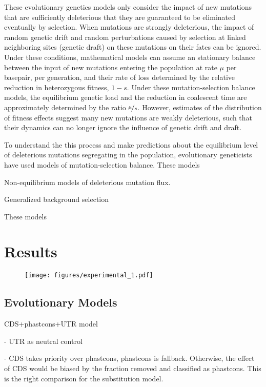 \documentclass[11pt]{article}
\begin{document}
These evolutionary genetics models only consider the impact of new mutations
that are sufficiently deleterious that they are guaranteed to be eliminated
eventually by selection. When mutations are strongly deleterious, the impact of
random genetic drift and random perturbations caused by selection at linked
neighboring sites (genetic draft) on these mutations on their fates can be
ignored. Under these conditions, mathematical models can assume an stationary
balance between the input of new mutations entering the population at rate
$\mu$ per basepair, per generation, and their rate of loss determined by the
relative reduction in heterozygous fitness, $1-s$. Under these
mutation-selection balance models, the equilibrium genetic load and the
reduction in coalescent time are approximately determined by the ratio
$\nicefrac{\mu}{s}$. However, estimates of the distribution of fitness effects
suggest many new mutations are weakly deleterious, such that their dynamics can
no longer ignore the influence of genetic drift and draft.



To understand the this process and make predictions about the equilibrium level
of deleterious mutations segregating in the population, evolutionary
geneticists have used models of mutation-selection balance. These models 

Non-equilibrium models of deleterious mutation flux.

Generalized background selection

These models 

\section*{Results}


\begin{figure}[!htb]
  \centering
  \texttt{[image: figures/experimental\_1.pdf]}
  \caption{}
  \label{fig:figure-1}
\end{figure}


\subsection*{Evolutionary Models}

CDS+phastcons+UTR model

 - UTR as neutral control

 - CDS takes priority over phastcons, phastcons is fallback. Otherwise, the
   effect of CDS would be biased by the fraction removed and classified as
   phastcons. This is the right comparison for the substitution model.
\end{document}
